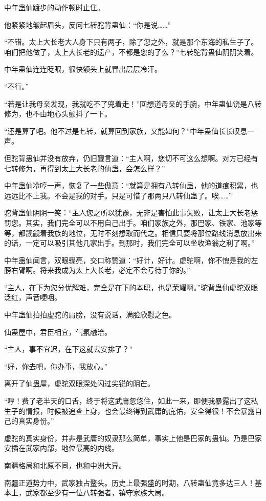 \begin{this_body}
中年蛊仙踱步的动作顿时止住。

他紧紧地皱起眉头，反问七转驼背蛊仙：“你是说……”

“不错。太上大长老大人身下只有两子，除了您之外，就是那个东海的私生子了。咱们把他做了，太上大长老的遗产，不都是您的了么？”七转驼背蛊仙阴阴笑着。

中年蛊仙连连眨眼，很快额头上就冒出层层冷汗。

“不行。”

“若是让我母亲发现，我就吃不了兜着走！”回想道母亲的手腕，中年蛊仙饶是八转修为，也不由地心头颤抖了一下。

“还是算了吧。他不过是七转，就算回到家族，又能如何？”中年蛊仙长长叹息一声。

但驼背蛊仙并没有放弃，仍旧觐言道：“主人啊，您切不可这么想啊。对方已经有七转修为，再得到太上大长老的仙蛊，会怎么样？”

中年蛊仙冷哼一声，恢复了一些傲意：“就算是拥有八转仙蛊，他的道痕积累，也远远比不上我。不会是我的对手。只是可惜了那两只八转仙蛊了。唉……”

驼背蛊仙阴阴一笑：“主人您之所以犹豫，无非是害怕此事失败，让太上大长老惩罚您。其实，我们完全可以不用自己出手。咱们家族之外，那巴家、铁家、池家等等，都觊觎着我族的地位，无时不刻想取而代之。相信只要将那位路线消息放出来的话，一定可以吸引其他几家出手。到那时，我们完全可以坐收渔翁之利了啊。”

中年蛊仙闻言，双眼骤亮，交口称赞道：“好计，好计。虚驼啊，你不愧是我的左膀右臂啊。将来我成为太上大长老，必定不会亏待于你的。”

“主人，在下为您分忧解难，完全是在下的本职，也是荣耀啊。”驼背蛊仙虚驼双眼泛红，声音哽咽。

中年蛊仙拍拍虚驼的肩膀，没有说话，满脸欣慰之色。

仙蛊屋中，君臣相宜，气氛融洽。

“主人，事不宜迟，在下这就去安排了？”

“好，你去吧，你办事，我放心。”

离开了仙蛊屋，虚驼双眼深处闪过尖锐的阴芒。

“哼！费了老半天的口舌，终于将这武庸忽悠住，如此一来，即便我暴露出了这私生子的情报，时候被追查上身，也会最终得到武庸的庇佑，安全得很！不会暴露自己的真实身份。”

虚驼的真实身份，并非是武庸的奴隶那么简单，事实上他是巴家的蛊仙。乃是巴家安插在武家内部，地位最高的内线。

南疆格局和北原不同，也和中洲大异。

南疆正道势力中，武家独占鳌头。历史上最强盛的时期，八转蛊仙竟多达三人！基本上，武家都至少有一位八转强者，镇守家族大局。


\end{this_body}
